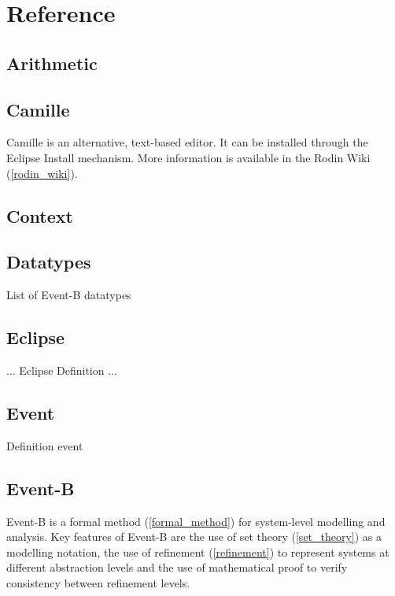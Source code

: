 \chapter{Reference}

\section{Arithmetic}
\label{arithmetic}

\section{Camille}
\label{camille}

Camille is an alternative, text-based editor.  It can be installed through the Eclipse Install mechanism.  More information is available in the Rodin Wiki (\ref{rodin_wiki}).

\section{Context}
\label{context}

\section{Datatypes}
\label{datatypes}

List of Event-B datatypes

\section{Eclipse}
\label{eclipse}

... Eclipse Definition ...

\section{Event}
\label{event}

Definition event

\section{Event-B}
\label{eventb}

Event-B is a formal method (\ref{formal_method}) for system-level modelling and analysis. Key features of Event-B are the use of set theory (\ref{set_theory}) as a modelling notation, the use of refinement (\ref{refinement}) to represent systems at different abstraction levels and the use of mathematical proof to verify consistency between refinement levels.

